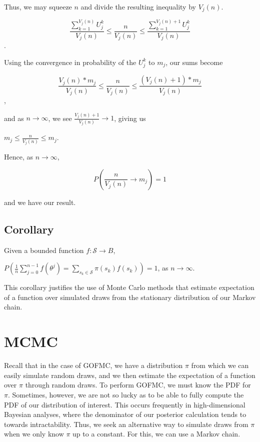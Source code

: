 \documentclass[12pt,twoside]{reedthesis}
\begin{document}
		Thus, we may squeeze $n$ and divide the resulting inequality by $V_j(n)$.
		\begin{center}
		$$\displaystyle\frac{\displaystyle\sum_{k=1}^{V_j(n)}U_j^k}{V_j(n)} \leq 
		\frac{n}{V_j(n)} \leq 
		\frac{\displaystyle\sum_{k=1}^{V_j(n) + 1}U_j^k}{V_j(n)}$$.
		\end{center}
		Using the convergence in probability of the $U_j^k$ to $m_j$, our sums become
		\begin{center}
		$$\displaystyle\frac{V_j(n) * m_j}{V_j(n)} \leq 
		\frac{n}{V_j(n)} \leq 
		\frac{(V_j(n)+1) * m_j}{V_j(n)}$$,
		\end{center}		
		 and as $n \rightarrow \infty$, we see $\frac{V_j(n) +1 }{V_j(n)} \rightarrow 1$, giving us
		 \begin{center}
		 	$ m_j \leq \displaystyle\frac{n}{V_j(n)} \leq m_j$.
		 \end{center}
		 Hence, as $n \rightarrow \infty$,
		 \begin{center}
		 $$
		 P\left( \displaystyle\frac{n}{V_j(n)} \longrightarrow {m_j} \right) = 1
		 $$
		 \end{center}
		 and we have our result.
		\subsection*{Corollary}
		Given a bounded function $f: \mathcal{S} \rightarrow B$,
		\begin{center}
			$P\left( \displaystyle \frac{1}{n} \sum_{j=0}^{n-1} f(\theta^{j}) 
			= \sum_{s_k \in \mathcal S} \pi(s_k) f(s_k) \right) = 1$, as $n \longrightarrow \infty$.
		\end{center}
		This corollary justifies the use of Monte Carlo methods that estimate expectation of a function over simulated draws from the stationary distribution of our Markov chain.
	\section{MCMC}
			Recall that in the case of GOFMC, we have a distribution $\pi$ from which we can easily simulate random draws, and we then estimate the expectation of a function over $\pi$ through random draws. To perform GOFMC, we must know the PDF for $\pi$. Sometimes, however, we are not so lucky as to be able to fully compute the PDF of our distribution of interest. This occurs frequently in high-dimensional Bayesian analyses, where the denominator of our posterior calculation tends to towards intractability. Thus, we seek an alternative way to simulate draws from $\pi$ when we only know $\pi$ up to a constant. For this, we can use a Markov chain.
\end{document}
